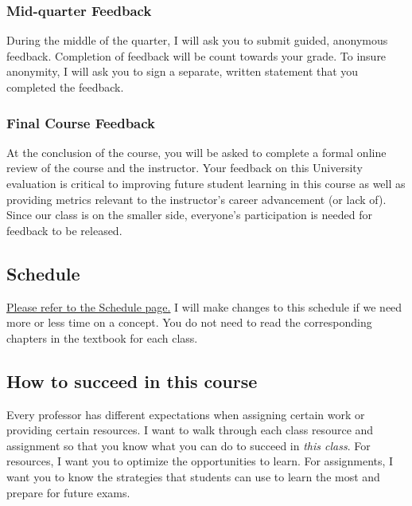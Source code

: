 \documentclass[
  letterpaper,
  DIV=11,
  numbers=noendperiod]{scrartcl}
\begin{document}
\hypertarget{mid-quarter-feedback}{%
\subsubsection{Mid-quarter Feedback}\label{mid-quarter-feedback}}

During the middle of the quarter, I will ask you to submit guided,
anonymous feedback. Completion of feedback will be count towards your
grade. To insure anonymity, I will ask you to sign a separate, written
statement that you completed the feedback.

\hypertarget{final-course-feedback}{%
\subsubsection{Final Course Feedback}\label{final-course-feedback}}

At the conclusion of the course, you will be asked to complete a formal
online review of the course and the instructor. Your feedback on this
University evaluation is critical to improving future student learning
in this course as well as providing metrics relevant to the instructor's
career advancement (or lack of). Since our class is on the smaller side,
everyone's participation is needed for feedback to be released.

\hypertarget{schedule}{%
\subsection{Schedule}\label{schedule}}

\href{/schedule1.qmd}{Please refer to the Schedule page.} I will make
changes to this schedule if we need more or less time on a concept. You
do not need to read the corresponding chapters in the textbook for each
class.

\hypertarget{how-to-succeed-in-this-course}{%
\subsection{How to succeed in this
course}\label{how-to-succeed-in-this-course}}

Every professor has different expectations when assigning certain work
or providing certain resources. I want to walk through each class
resource and assignment so that you know what you can do to succeed in
\emph{this class}. For resources, I want you to optimize the
opportunities to learn. For assignments, I want you to know the
strategies that students can use to learn the most and prepare for
future exams.
\end{document}
